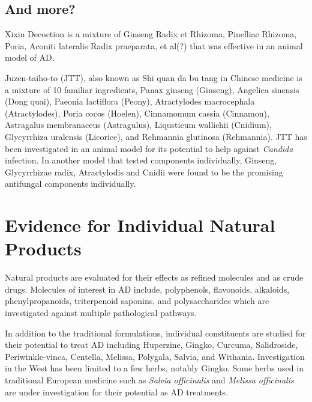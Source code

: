 \documentclass[twocolumn]{article}
\begin{document}
\cite{zhang2015cognitive}


\subsection{And more?}


Xixin Decoction is a mixture of
Ginseng Radix et Rhizoma,
Pinelliae Rhizoma,
Poria,
Aconiti lateralis Radix praeparata,
et al(?)
that was effective in an animal model of AD.
\cite{diwu2013effect}



Juzen-taiho-to (JTT), also known as
Shi quan da bu tang in Chinese medicine
is a mixture of 10 familiar ingredients,
Panax ginseng (Ginseng),
Angelica sinensis (Dong quai),
Paeonia lactiflora (Peony),
Atractylodes macrocephala (Atractylodes),
Poria cocos (Hoelen),
Cinnamomum cassia (Cinnamon),
Astragalus membranaceus (Astragulus),
Liqusticum wallichii (Cnidium),
Glycyrrhiza uralensis (Licorice),
and Rehmannia glutinosa (Rehmannia).
JTT has been investigated in an animal model
for its potential to help against \textit{Candida}
infection.
\cite{akagawa1996protection}
In another model that tested components individually,
Ginseng, Glycyrrhizae radix, Atractylodis and Cnidii
were found to be the promising antifungal components individually.
\cite{abe1998protective}



%
%

\section{Evidence for Individual Natural Products}


Natural products are evaluated for their effects
as refined molecules and
as crude drugs.
Molecules of interest in AD include,
polyphenols,
flavonoids,
alkaloids,
phenylpropanoids,
triterpenoid saponins,
and polysaccharides
which are investigated
against multiple pathological pathways.
\cite{
darvesh2010oxidative,
gao2013research
}

In addition to the traditional formulations,
individual constituents are studied for their potential
to treat AD including
Huperzine,
Gingko,
Curcuma,
Salidroside,
Periwinkle-vinca,
Centella,
Melissa,
Polygala,
Salvia,
and Withania.
\cite{sun2013traditional}
Investigation in the West has been limited to a few herbs,
notably Gingko. Some herbs used in traditional European medicine
such as \textit{Salvia officinalis} and \textit{Melissa officinalis}
are under investigation for their potential as AD treatments.
\cite{perry1999medicinal}
\end{document}
